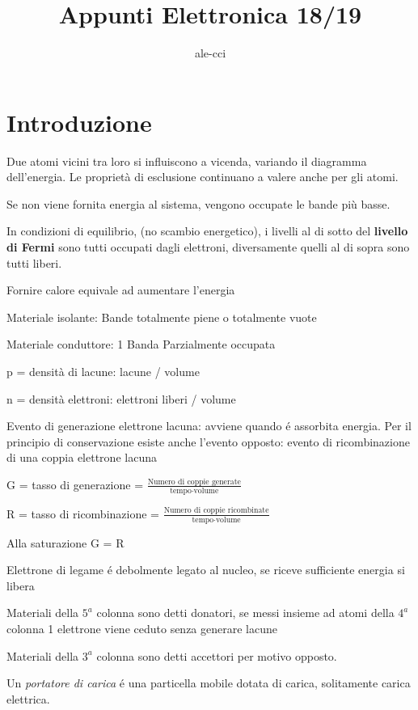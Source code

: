 \documentclass{article}
\author{ale-cci}
\title{Appunti Elettronica 18/19}
\begin{document}
\maketitle{}
\tableofcontents{}
\newpage


\section{Introduzione}
Due atomi vicini tra loro si influiscono a vicenda, variando il diagramma dell'energia.
Le proprietà di esclusione continuano a valere anche per gli atomi.

Se non viene fornita energia al sistema, vengono occupate le bande più basse.

In condizioni di equilibrio, (no scambio energetico), i livelli al di sotto del \textbf{livello di Fermi} sono tutti occupati dagli elettroni, diversamente quelli al di sopra sono tutti liberi.

Fornire calore equivale ad aumentare l'energia

Materiale isolante: Bande totalmente piene o totalmente vuote

Materiale conduttore: 1 Banda Parzialmente occupata

p = densità di lacune: lacune / volume

n = densità elettroni: elettroni liberi / volume


Evento di generazione elettrone lacuna: avviene quando \'e assorbita energia. Per il principio di conservazione esiste anche l'evento opposto: evento di ricombinazione di una coppia elettrone lacuna


G = tasso di generazione = $\frac{\text{Numero di coppie generate}}{\text{tempo}\cdot\text{volume}}$

R = tasso di ricombinazione = $\frac{\text{Numero di coppie ricombinate}}{\text{tempo}\cdot\text{volume}}$

Alla saturazione G = R


Elettrone di legame \'e debolmente legato al nucleo, se riceve sufficiente energia si libera

Materiali della $5^a$ colonna sono detti donatori, se messi insieme ad atomi della $4^a$ colonna 1 elettrone viene ceduto senza generare lacune

Materiali della $3^a$ colonna sono detti accettori per motivo opposto.

Un \textit{portatore di carica} \'e una particella mobile dotata di carica, solitamente carica elettrica.
\end{document}
